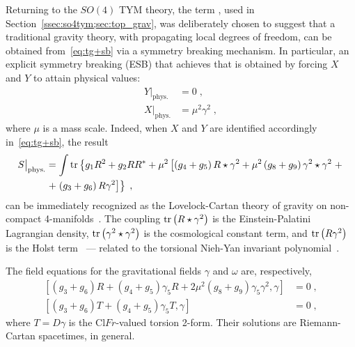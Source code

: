 \documentclass[../main.tex]{subfiles}
\begin{document}
Returning to the $SO(4)$ TYM theory, the term , used in Section~\ref{ssec:so4tym;sec:top_grav}, was deliberately chosen to suggest that a traditional gravity theory, with propagating local degrees of freedom, can be obtained from~\eqref{eq:tg+sb} via a symmetry breaking mechanism. In particular, an explicit symmetry breaking (ESB) that achieves that is obtained by forcing $X$ and $Y$ to attain physical values:
\begin{subequations}%
  \label{eq:physicalxy}
  \begin{align}
    Y\big|_{\text{phys.}} & = 0 \;, \label{eq:physicalsource1}              \\
    X\big|_{\text{phys.}} & = \mu^2 \gamma^2 \;, \label{eq:physicalsource2}
  \end{align}
\end{subequations}
where $\mu$ is a mass scale. Indeed, when $X$ and $Y$ are identified accordingly in~\eqref{eq:tg+sb}, the result
\begin{align}
  \label{eq:llc_action}
  S\big|_{\text{phys.}} & = \int \operatorname{tr} \left\{ g_1 R^2 + g_2 R R^* + \mu^2 \left[ \left( g_4 + g_5 \right) R \star \gamma^2 + \mu^2 \left( g_8 + g_9 \right) \gamma^2 \star \gamma^2  \right. + \right. \nonumber \\
                        & \left. + \left. \left( g_3 + g_6 \right) R \gamma^2 \right] \right\} \;,
\end{align}
can be immediately recognized as the Lovelock-Cartan theory of gravity on non-compact 4-manifolds~\cite{mardones1991a,hassaine2016a,corichi2016a}. The coupling $\operatorname{tr} \left( R \star \gamma^2 \right)$ is the Einstein-Palatini Lagrangian density, $\operatorname{tr} \left( \gamma^2 \star \gamma^2 \right)$ is the cosmological constant term, and $\operatorname{tr} \left( R \gamma^2 \right)$ is the Holst term~\cite{holst1996a} --- related to the torsional Nieh-Yan invariant polynomial~\cite{nieh1982a,chandia1997a,nieh2007a}.

The field equations for the gravitational fields $\gamma$ and $\omega$ are, respectively,
\begin{subequations}%
  \label{eq:grav_field_eqs}
  \begin{align}
    \left[ \left( g_3 + g_6 \right) R + \left( g_4 + g_5 \right) \gamma_5 R + 2 \mu^2 \left( g_8 + g_9 \right) \gamma_5\gamma^2 , \gamma \right] & = 0 \;, \\
    \left[ \left( g_3 + g_6 \right) T + \left( g_4 + g_5 \right) \gamma_5 T, \gamma \right]                                                      & = 0 \;,
  \end{align}
\end{subequations}
where $ T = D \gamma $ is the $\mathrm{Cl}Fr$-valued torsion 2-form. Their solutions are Riemann-Cartan spacetimes, in general.
\end{document}
